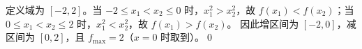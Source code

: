 定义域为 $[-2,2]$。当 $-2\le x_1<x_2\le0$ 时，$x_1^2>x_2^2$，故 $f(x_1)<f(x_2)$；当 $0\le x_1<x_2\le2$ 时，$x_1^2<x_2^2$，故 $f(x_1)>f(x_2)$。
因此增区间为 $[-2,0]$，减区间为 $[0,2]$，且 $\boxed{f_{\max}=2}$（$x=0$ 时取到）。\qed
